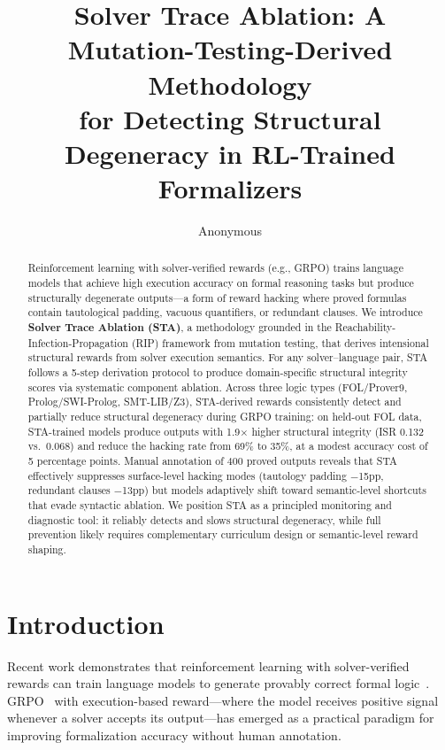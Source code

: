 \documentclass[11pt,a4paper]{article}
\title{Solver Trace Ablation: A Mutation-Testing-Derived Methodology\\for Detecting Structural Degeneracy in RL-Trained Formalizers}
\author{Anonymous}
\begin{document}
\maketitle

\begin{abstract}
Reinforcement learning with solver-verified rewards (e.g., GRPO) trains language models that achieve high execution accuracy on formal reasoning tasks but produce structurally degenerate outputs---a form of reward hacking where proved formulas contain tautological padding, vacuous quantifiers, or redundant clauses.
We introduce \textbf{Solver Trace Ablation (STA)}, a methodology grounded in the Reachability-Infection-Propagation (RIP) framework from mutation testing, that derives intensional structural rewards from solver execution semantics.
For any solver--language pair, STA follows a 5-step derivation protocol to produce domain-specific structural integrity scores via systematic component ablation.
Across three logic types (FOL/Prover9, Prolog/SWI-Prolog, SMT-LIB/Z3), STA-derived rewards consistently detect and partially reduce structural degeneracy during GRPO training: on held-out FOL data, STA-trained models produce outputs with 1.9$\times$ higher structural integrity (ISR 0.132 vs.\ 0.068) and reduce the hacking rate from 69\% to 35\%, at a modest accuracy cost of 5 percentage points.
Manual annotation of 400 proved outputs reveals that STA effectively suppresses surface-level hacking modes (tautology padding $-$15pp, redundant clauses $-$13pp) but models adaptively shift toward semantic-level shortcuts that evade syntactic ablation.
We position STA as a principled monitoring and diagnostic tool: it reliably detects and slows structural degeneracy, while full prevention likely requires complementary curriculum design or semantic-level reward shaping.
\end{abstract}

\section{Introduction}

Recent work demonstrates that reinforcement learning with solver-verified rewards can train language models to generate provably correct formal logic~\cite{xie2025logic,wu2025agentic}.
GRPO~\cite{shao2024deepseekmath} with execution-based reward---where the model receives positive signal whenever a solver accepts its output---has emerged as a practical paradigm for improving formalization accuracy without human annotation.
\end{document}
